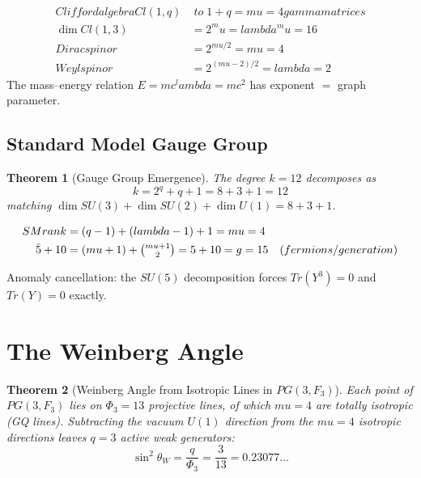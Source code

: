 \documentclass[12pt,a4paper]{article}
\def\mathbb#1{#1}%
\def\mathrm#1{#1}%
\def\mathbf#1{#1}%
\def\text#1{#1}%
\def\lambda{lambda}%
\def\mu{mu}%
\def\Phi#1{Phi#1}%
\def\to{ to }%
\newtheorem{theorem}{Theorem}[section]
\theoremstyle{definition}
\newcommand{\PG}{\mathrm{PG}}
\newcommand{\SU}{\mathrm{SU}}
\newcommand{\Cl}{\mathrm{Cl}}
\renewcommand{\Tr}{\mathrm{Tr}}
\newcommand{\Phithree}{\Phi_3}
\newcommand{\FF}{\mathbb{F}}
\begin{document}
\begin{align}
\text{Clifford algebra }\Cl(1,q) &\;\to\; 1+q = \mu = 4\text{ gamma matrices} \\
\dim\Cl(1,3) &= 2^\mu = \lambda^\mu = 16 \\
\text{Dirac spinor} &= 2^{\mu/2} = \mu = 4 \\
\text{Weyl spinor} &= 2^{(\mu-2)/2} = \lambda = 2
\end{align}
The mass--energy relation $E=mc^\lambda = mc^2$ has exponent $=$ graph parameter.


\subsection{Standard Model Gauge Group}

\begin{theorem}[Gauge Group Emergence]
The degree $k=12$ decomposes as
\begin{equation}
k = 2^q + q + 1 = 8 + 3 + 1 = 12
\end{equation}
matching $\dim\SU(3)+\dim\SU(2)+\dim\mathrm{U}(1) = 8+3+1$.
\end{theorem}

\begin{align}
\text{SM rank} &= (q-1)+(\lambda-1)+1 = \mu = 4 \\
\bar{\mathbf{5}}+\mathbf{10} &= (\mu+1)+\tbinom{\mu+1}{2} = 5+10 = g = 15
  \quad\text{(fermions/generation)}
\end{align}

Anomaly cancellation: the $\SU(5)$ decomposition forces
$\Tr(Y^3)=0$ and $\Tr(Y)=0$ exactly.


\section{The Weinberg Angle}
\label{sec:weinberg}

\begin{theorem}[Weinberg Angle from Isotropic Lines in $\PG(3,\FF_3)$]
\label{thm:weinberg}
Each point of $\PG(3,\FF_3)$ lies on $\Phithree = 13$ projective lines,
of which $\mu=4$ are totally isotropic (GQ lines).
Subtracting the vacuum $\mathrm{U}(1)$ direction from the $\mu=4$
isotropic directions leaves $q=3$ active weak generators:
\begin{equation}
\boxed{\sin^2\theta_W = \frac{q}{\Phithree}
= \frac{3}{13} = 0.23077\ldots}
\label{eq:weinberg}
\end{equation}
\end{theorem}
\end{document}
